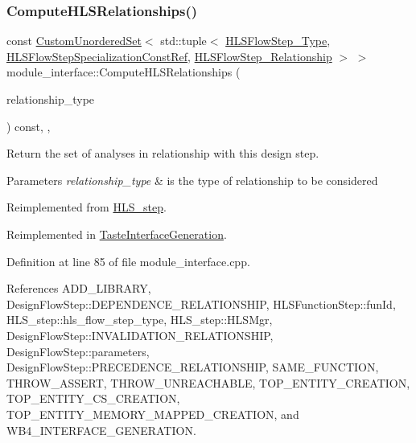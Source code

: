 \subsubsection{\texorpdfstring{Compute\+H\+L\+S\+Relationships()}{ComputeHLSRelationships()}}
{\footnotesize\ttfamily const \hyperlink{classCustomUnorderedSet}{Custom\+Unordered\+Set}$<$ std\+::tuple$<$ \hyperlink{hls__step_8hpp_ada16bc22905016180e26fc7e39537f8d}{H\+L\+S\+Flow\+Step\+\_\+\+Type}, \hyperlink{hls__step_8hpp_a5fdd2edf290c196531d21d68e13f0e74}{H\+L\+S\+Flow\+Step\+Specialization\+Const\+Ref}, \hyperlink{hls__step_8hpp_a3ad360b9b11e6bf0683d5562a0ceb169}{H\+L\+S\+Flow\+Step\+\_\+\+Relationship} $>$ $>$ module\+\_\+interface\+::\+Compute\+H\+L\+S\+Relationships (\begin{DoxyParamCaption}\item[{const \hyperlink{classDesignFlowStep_a723a3baf19ff2ceb77bc13e099d0b1b7}{Design\+Flow\+Step\+::\+Relationship\+Type}}]{relationship\+\_\+type }\end{DoxyParamCaption}) const\hspace{0.3cm}{\ttfamily [override]}, {\ttfamily [protected]}, {\ttfamily [virtual]}}



Return the set of analyses in relationship with this design step. 


\begin{DoxyParams}{Parameters}
{\em relationship\+\_\+type} & is the type of relationship to be considered \\
\hline
\end{DoxyParams}


Reimplemented from \hyperlink{classHLS__step_aed0ce8cca9a1ef18e705fc1032ad4de5}{H\+L\+S\+\_\+step}.



Reimplemented in \hyperlink{classTasteInterfaceGeneration_ac81f5d05e67e11e91d4a03e6437a9fc0}{Taste\+Interface\+Generation}.



Definition at line 85 of file module\+\_\+interface.\+cpp.



References A\+D\+D\+\_\+\+L\+I\+B\+R\+A\+RY, Design\+Flow\+Step\+::\+D\+E\+P\+E\+N\+D\+E\+N\+C\+E\+\_\+\+R\+E\+L\+A\+T\+I\+O\+N\+S\+H\+IP, H\+L\+S\+Function\+Step\+::fun\+Id, H\+L\+S\+\_\+step\+::hls\+\_\+flow\+\_\+step\+\_\+type, H\+L\+S\+\_\+step\+::\+H\+L\+S\+Mgr, Design\+Flow\+Step\+::\+I\+N\+V\+A\+L\+I\+D\+A\+T\+I\+O\+N\+\_\+\+R\+E\+L\+A\+T\+I\+O\+N\+S\+H\+IP, Design\+Flow\+Step\+::parameters, Design\+Flow\+Step\+::\+P\+R\+E\+C\+E\+D\+E\+N\+C\+E\+\_\+\+R\+E\+L\+A\+T\+I\+O\+N\+S\+H\+IP, S\+A\+M\+E\+\_\+\+F\+U\+N\+C\+T\+I\+ON, T\+H\+R\+O\+W\+\_\+\+A\+S\+S\+E\+RT, T\+H\+R\+O\+W\+\_\+\+U\+N\+R\+E\+A\+C\+H\+A\+B\+LE, T\+O\+P\+\_\+\+E\+N\+T\+I\+T\+Y\+\_\+\+C\+R\+E\+A\+T\+I\+ON, T\+O\+P\+\_\+\+E\+N\+T\+I\+T\+Y\+\_\+\+C\+S\+\_\+\+C\+R\+E\+A\+T\+I\+ON, T\+O\+P\+\_\+\+E\+N\+T\+I\+T\+Y\+\_\+\+M\+E\+M\+O\+R\+Y\+\_\+\+M\+A\+P\+P\+E\+D\+\_\+\+C\+R\+E\+A\+T\+I\+ON, and W\+B4\+\_\+\+I\+N\+T\+E\+R\+F\+A\+C\+E\+\_\+\+G\+E\+N\+E\+R\+A\+T\+I\+ON.



